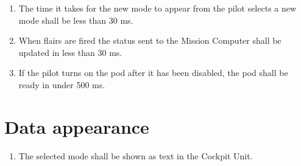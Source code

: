 \documentclass[Main]{subfiles}
\begin{document}
\begin{enumerate}[label=\bfseries DDD-2.\arabic*:]

\item The time it takes for the new mode to appear from the pilot selects a new mode shall be less than 30 ms.\label{DDD-21}

\item When flairs are fired the status sent to the Mission Computer shall be updated in less than 30 ms.\label{DDD-22}

\item If the pilot turns on the pod after it has been disabled, the pod shall be ready in under 500 ms.\label{DDD-23}

\end{enumerate}




\section{Data appearance}

\begin{enumerate}[label=\bfseries DDD-3.\arabic*:]

\item The selected mode shall be shown as text in the Cockpit Unit.\label{DDD-31}

\end{enumerate}



%
%
%
\end{document}
